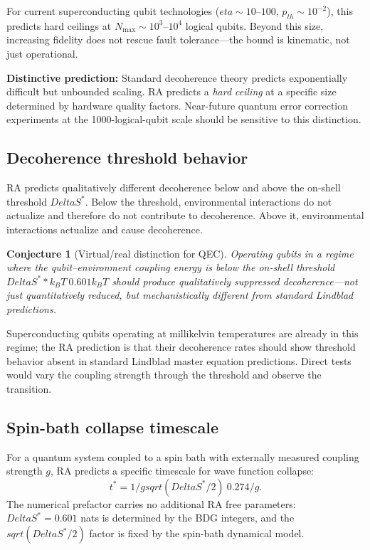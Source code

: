 \documentclass[11pt]{article}
\def\Delta{Delta}%
\def\eta{eta}%
\def\mathrm#1{#1}%
\def\sqrt#1{sqrt(#1)}%
\def\frac#1#2{#1/#2}%
\def\cdot{*}%
\def\approx{~}%
\newtheorem{conjecture}{Conjecture}
\begin{document}
For current superconducting qubit technologies ($\eta \sim 10$--$100$, $p_{\mathrm{th}} \sim 10^{-2}$), this predicts hard ceilings at $N_{\max} \sim 10^3$--$10^4$ logical qubits. Beyond this size, increasing fidelity does not rescue fault tolerance---the bound is kinematic, not just operational.

\textbf{Distinctive prediction:} Standard decoherence theory predicts exponentially difficult but unbounded scaling. RA predicts a \emph{hard ceiling} at a specific size determined by hardware quality factors. Near-future quantum error correction experiments at the 1000-logical-qubit scale should be sensitive to this distinction.

\subsection{Decoherence threshold behavior}
\label{sec:threshold_decoherence}

RA predicts qualitatively different decoherence below and above the on-shell threshold $\Delta S^*$. Below the threshold, environmental interactions do not actualize and therefore do not contribute to decoherence. Above it, environmental interactions actualize and cause decoherence.

\begin{conjecture}[Virtual/real distinction for QEC]
Operating qubits in a regime where the qubit--environment coupling energy is below the on-shell threshold $\Delta S^* \cdot k_B T \approx 0.601 k_B T$ should produce qualitatively suppressed decoherence---not just quantitatively reduced, but mechanistically different from standard Lindblad predictions.
\end{conjecture}

Superconducting qubits operating at millikelvin temperatures are already in this regime; the RA prediction is that their decoherence rates should show threshold behavior absent in standard Lindblad master equation predictions. Direct tests would vary the coupling strength through the threshold and observe the transition.

\subsection{Spin-bath collapse timescale}
\label{sec:spinbath}

For a quantum system coupled to a spin bath with externally measured coupling strength $g$, RA predicts a specific timescale for wave function collapse:
\begin{equation}
\label{eq:spinbath}
\boxed{t^* = \frac{1}{g}\sqrt{\frac{\Delta S^*}{2}} \approx \frac{0.274}{g}.}
\end{equation}
The numerical prefactor carries no additional RA free parameters: $\Delta S^* = 0.601$ nats is determined by the BDG integers, and the $\sqrt{\Delta S^*/2}$ factor is fixed by the spin-bath dynamical model.
\end{document}
